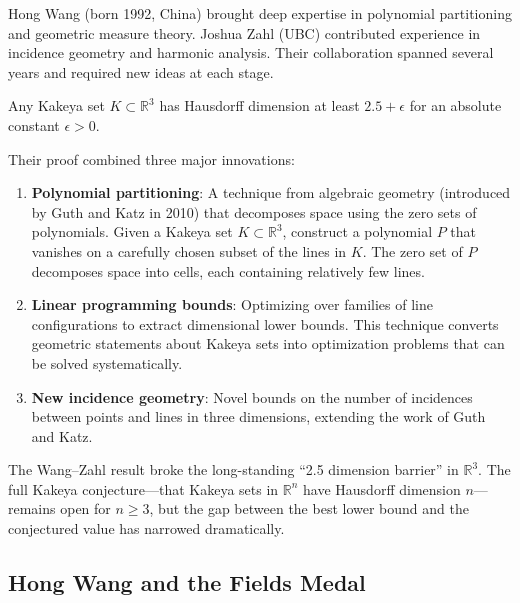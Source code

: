 \begin{historicalbox}
Hong Wang (born 1992, China) brought deep expertise in polynomial partitioning and geometric measure theory. Joshua Zahl (UBC) contributed experience in incidence geometry and harmonic analysis. Their collaboration spanned several years and required new ideas at each stage.
\end{historicalbox}

\begin{theorem}
Any Kakeya set $K \subset \mathbb{R}^3$ has Hausdorff dimension at least $2.5 + \epsilon$ for an absolute constant $\epsilon > 0$.
\end{theorem}

Their proof combined three major innovations:

\begin{enumerate}
\item \textbf{Polynomial partitioning}: A technique from algebraic geometry (introduced by Guth and Katz in 2010) that decomposes space using the zero sets of polynomials. Given a Kakeya set $K \subset \mathbb{R}^3$, construct a polynomial $P$ that vanishes on a carefully chosen subset of the lines in $K$. The zero set of $P$ decomposes space into cells, each containing relatively few lines.
\item \textbf{Linear programming bounds}: Optimizing over families of line configurations to extract dimensional lower bounds. This technique converts geometric statements about Kakeya sets into optimization problems that can be solved systematically.
\item \textbf{New incidence geometry}: Novel bounds on the number of incidences between points and lines in three dimensions, extending the work of Guth and Katz.
\end{enumerate}

\begin{highlightbox}
The Wang--Zahl result broke the long-standing ``2.5 dimension barrier'' in $\mathbb{R}^3$. The full Kakeya conjecture---that Kakeya sets in $\mathbb{R}^n$ have Hausdorff dimension $n$---remains open for $n \geq 3$, but the gap between the best lower bound and the conjectured value has narrowed dramatically.
\end{highlightbox}

\subsection{Hong Wang and the Fields Medal}

